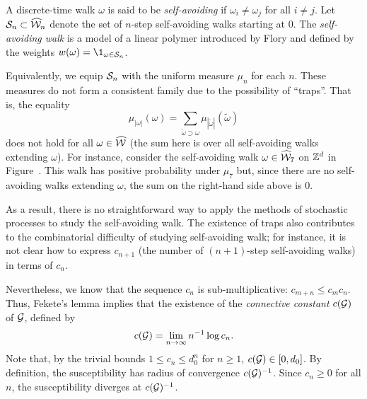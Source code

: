 \begin{example}
A discrete-time walk $\omega$ is said to be \emph{self-avoiding} if
$\omega_i \ne \omega_j$
for all $i \ne j$. Let $\mathcal{S}_n \subset \widehat{\mathcal{W}}_n$ denote the set of $n$-step
self-avoiding walks starting at $0$.
The \emph{self-avoiding walk} is a model of a linear polymer introduced by
Flory \REF and defined by the weights $w(\omega) = \1_{\omega\in\Scal_n}$.

Equivalently, we equip $\mathcal{S}_n$ with the uniform measure $\mu_n$ for each $n$.
These measures do not form a consistent family due to the possibility of ``traps''. That is, the equality
\begin{equation}
\mu_{|\omega|}(\omega) = \sum_{\tilde\omega \supset \omega} \mu_{|\tilde\omega|}(\tilde\omega)
\end{equation}
does not hold for all $\omega\in\widehat{\mathcal{W}}$ (the sum here is over all self-avoiding walks extending $\omega$).
For instance, consider the self-avoiding walk $\omega\in\widehat{\mathcal{W}}_7$
on ${ {{\mathbb Z}}^d }$ in Figure~\REF. %
This walk has positive probability under $\mu_7$ but,
since there are no self-avoiding walks extending $\omega$, the sum on the 
right-hand side above is $0$.

As a result, there is no straightforward way to apply the methods of stochastic processes
to study the self-avoiding walk. The existence of traps also contributes to the
combinatorial difficulty of studying self-avoiding walk; for instance, it is
not clear how to express $c_{n+1}$ (the number of $(n+1)$-step self-avoiding walks)
in terms of $c_n$.

Nevertheless, we know that the sequence $c_n$ is sub-multiplicative: $c_{m+n} \le c_m c_n$.
Thus, Fekete's lemma \REF implies that the existence of the \emph{connective constant}
$c(\mathcal{G})$ of $\mathcal{G}$, defined by
\begin{equation}
c(\mathcal{G}) = \lim_{n\rightarrow\infty} n^{-1} \log c_n.
\end{equation}
Note that, by the trivial bounds $1 \le c_n \le d_0^n$ for $n \ge 1$, $c(\mathcal{G}) \in [0, d_0]$.
By definition, the susceptibility has radius of convergence $c(\mathcal{G})^{-1}$.
Since $c_n \ge 0$ for all $n$, the susceptibility diverges at $c(\mathcal{G})^{-1}$.
\end{example}

